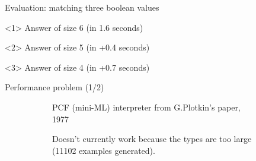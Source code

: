 \documentclass[aspectratio=169
  , xcolor={svgnames}
  , hyperref={ colorlinks,citecolor=Blue
             , linkcolor=DarkRed,urlcolor=DarkBlue}
  , russian
  ]{beamer}
\begin{document}
\begin{frame}{Evaluation: matching three boolean values}
\begin{minipage}[c][5cm][t]{0.32\linewidth}
\begin{minipage}{0.35\linewidth}
\synthInputA
\end{minipage}
\end{minipage}
\begin{minipage}{0.63\linewidth}
\begin{onlyenv}<1>
Answer of size 6 (in 1.6 seconds)

\begin{minipage}{0.63\linewidth}
\synthResultA
\end{minipage}
\end{onlyenv}
\begin{onlyenv}<2>
Answer of size 5 (in +0.4 seconds)

\begin{minipage}{0.63\linewidth}
\synthResultB
\end{minipage}
\end{onlyenv}
\begin{onlyenv}<3>
Answer of size 4 (in +0.7 seconds)

\begin{minipage}{0.63\linewidth}
\synthResultC
\end{minipage}
\end{onlyenv}
\end{minipage}
\end{frame}



\begin{frame}{Performance problem (1/2)}
\begin{figure}
\begin{subfigure}[t]{0.5\linewidth}\vspace{0em}
\begin{minipage}{0.5\linewidth}
\plotkinBig
\end{minipage}
\end{subfigure}
\hspace{1cm}
\begin{subfigure}[t]{0.35\linewidth}\vspace{0em}
PCF (mini-ML) interpreter from G.Plotkin's paper, 1977
\vspace{4em}

Doesn't currently work because the types are too large (11102 examples  generated).
\end{subfigure}
\end{figure}
\end{frame}
\end{document}
